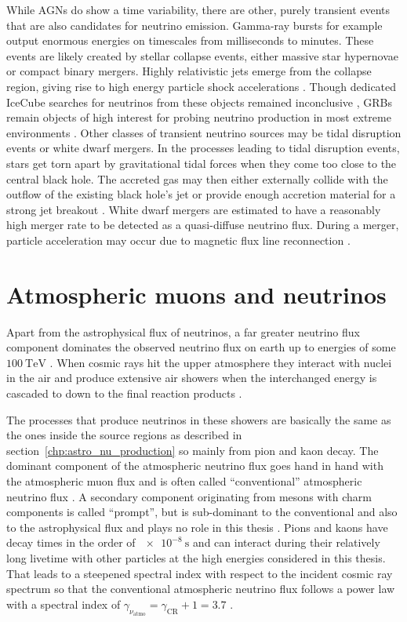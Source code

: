 While AGNs do show a time variability, there are other, purely transient events that are also candidates for neutrino emission.
Gamma-ray bursts for example output enormous energies on timescales from milliseconds to minutes.
These events are likely created by stellar collapse events, either massive star hypernovae or compact binary mergers.
Highly relativistic jets emerge from the collapse region, giving rise to high energy particle shock accelerations \cite{Bianco:2007fe}.
Though dedicated IceCube searches for neutrinos from these objects remained inconclusive \cite{Aartsen:2016qcr,Abbasi:2010grb}, GRBs remain objects of high interest for probing neutrino production in most extreme environments \cite{Senno:2016grb}.
Other classes of transient neutrino sources may be tidal disruption events or white dwarf mergers.
In the processes leading to tidal disruption events, stars get torn apart by gravitational tidal forces when they come too close to the central black hole.
The accreted gas may then either externally collide with the outflow of the existing black hole's jet or provide enough accretion material for a strong jet breakout \cite{Mattila:2018gsg}.
White dwarf mergers are estimated to have a reasonably high merger rate to be detected as a quasi-diffuse neutrino flux.
During a merger, particle acceleration may occur due to magnetic flux line reconnection \cite{Xiao:2016man}.


\section{Atmospheric muons and neutrinos}
Apart from the astrophysical flux of neutrinos, a far greater neutrino flux component dominates the observed neutrino flux on earth up to energies of some $\SI{100}{\TeV}$ \cite{Engberg:2008prompt,Gaisser:2002jj}.
When cosmic rays hit the upper atmosphere they interact with nuclei in the air and produce extensive air showers when the interchanged energy is cascaded to down to the final reaction products \cite{Gaisser:2016uoy}.

The processes that produce neutrinos in these showers are basically the same as the ones inside the source regions as described in section~\ref{chp:astro_nu_production} so mainly from pion and kaon decay.
The dominant component of the atmospheric neutrino flux goes hand in hand with the atmospheric muon flux and is often called \enquote{conventional} atmospheric neutrino flux \cite{Gaisser:2002jj,Gondolo:1995fq}.
A secondary component originating from mesons with charm components is called \enquote{prompt}, but is sub-dominant to the conventional and also to the astrophysical flux and plays no role in this thesis \cite{Engberg:2008prompt,Haack:2017dxi}.
Pions and kaons have decay times in the order of $\SI{e-8}{\s}$ \cite{Patrignani:2016xqp} and can interact during their relatively long livetime with other particles at the high energies considered in this thesis.
That leads to a steepened spectral index with respect to the incident cosmic ray spectrum so that the conventional atmospheric neutrino flux follows a power law with a spectral index of $\gamma_{\nu_\text{atmo}} = \gamma_\text{CR} + 1 = 3.7$ \cite{Gondolo:1995fq}.
